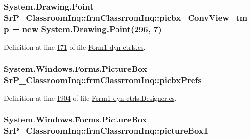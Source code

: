 \hypertarget{class_sr_p___classroom_inq_1_1frm_classrrom_inq_ae49fd425a3c4f52d94af6c20b67f6126}{
\subsubsection[{picbx\-\_\-\-Conv\-View\-\_\-tmp}]{\setlength{\rightskip}{0pt plus 5cm}\-System.\-Drawing.\-Point {\bf \-Sr\-P\-\_\-\-Classroom\-Inq\-::frm\-Classrrom\-Inq\-::picbx\-\_\-\-Conv\-View\-\_\-tmp} = new \-System.\-Drawing.\-Point(296, 7)}}
\label{class_sr_p___classroom_inq_1_1frm_classrrom_inq_ae49fd425a3c4f52d94af6c20b67f6126}


\-Definition at line \hyperlink{_form1-dyn-ctrls_8cs_source_l00171}{171} of file \hyperlink{_form1-dyn-ctrls_8cs_source}{\-Form1-\/dyn-\/ctrls.\-cs}.

\hypertarget{class_sr_p___classroom_inq_1_1frm_classrrom_inq_ad71fe1b1dd90eb59594ecf4a175e1b03}{
\subsubsection[{picbx\-Prefs}]{\setlength{\rightskip}{0pt plus 5cm}\-System.\-Windows.\-Forms.\-Picture\-Box {\bf \-Sr\-P\-\_\-\-Classroom\-Inq\-::frm\-Classrrom\-Inq\-::picbx\-Prefs}}}
\label{class_sr_p___classroom_inq_1_1frm_classrrom_inq_ad71fe1b1dd90eb59594ecf4a175e1b03}


\-Definition at line \hyperlink{_form1-dyn-ctrls_8_designer_8cs_source_l01904}{1904} of file \hyperlink{_form1-dyn-ctrls_8_designer_8cs_source}{\-Form1-\/dyn-\/ctrls.\-Designer.\-cs}.

\hypertarget{class_sr_p___classroom_inq_1_1frm_classrrom_inq_ab971146df86e1277868bef4199a7b8f4}{
\subsubsection[{picture\-Box1}]{\setlength{\rightskip}{0pt plus 5cm}\-System.\-Windows.\-Forms.\-Picture\-Box {\bf \-Sr\-P\-\_\-\-Classroom\-Inq\-::frm\-Classrrom\-Inq\-::picture\-Box1}}}
\label{class_sr_p___classroom_inq_1_1frm_classrrom_inq_ab971146df86e1277868bef4199a7b8f4}


